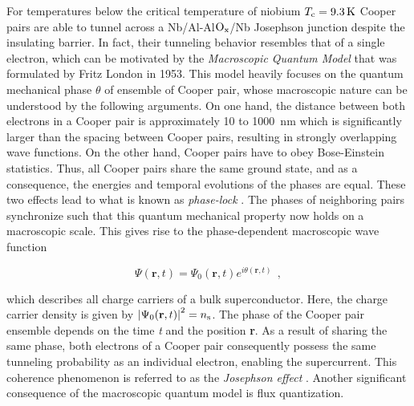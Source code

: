 For temperatures below the critical temperature of niobium $T_{\rm c}  = \qty{9.3}{\kelvin}$ \cite{Inaba_1980} Cooper pairs are able to tunnel across a Nb/Al-Al$\rm O_x$/Nb Josephson junction despite the insulating barrier. In fact, their tunneling behavior resembles that of a single electron, which can be motivated by the  \textit{Macroscopic Quantum Model} that was formulated by Fritz London in 1953. This model heavily focuses on the quantum mechanical phase $\theta$ of ensemble of Cooper pair, whose macroscopic nature can be understood by the following arguments. On one hand, the distance between both electrons in a Cooper pair is approximately 10 to \qty{1000}{\nm} which is significantly larger than the spacing between Cooper pairs, resulting in strongly overlapping wave functions. On the other hand, Cooper pairs have to obey Bose-Einstein statistics. Thus, all Cooper pairs share the same ground state, and as a consequence, the energies and temporal evolutions of the phases are equal. These two effects lead to what is known as \textit{phase-lock} \cite{Gross2016}. The phases of neighboring pairs synchronize such that this quantum mechanical property now holds on a macroscopic scale. This gives rise to the phase-dependent macroscopic wave function

\begin{equation}
\Psi(\textbf{r},t) = \Psi_0(\textbf{r},t)e^{i\theta(\textbf{r},t)} \ \ ,
\end{equation}

which describes all charge carriers of a bulk superconductor. Here, the charge carrier density is given by $\left|\Psi_0(\textbf{r},t)\right|^2 = n_{\rm s}$. The phase of the Cooper pair ensemble depends on the time \textit{t} and the position \textbf{r}. As a result of sharing the same phase, both electrons of a Cooper pair consequently possess the same tunneling probability as an individual electron, enabling the supercurrent. This coherence phenomenon is referred to as the \textit{Josephson effect} \cite{Josephson1962}. Another significant consequence of the macroscopic quantum model is flux quantization. 

